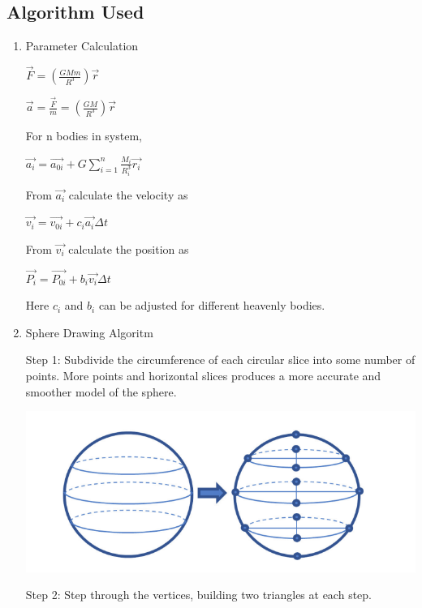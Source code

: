 \documentclass[12pt]{article}
\begin{document}
\subsection{Algorithm Used}
\begin{enumerate}
	\item Parameter Calculation
	
	\qquad$\vec{F} = (\frac{GMm}{R^{3}})\vec{r}$
	
	\qquad$\vec{a} = \frac{\vec{F}}{m} = (\frac{GM}{R^{3}})\vec{r}$
	
	For n bodies in system,
	
	\qquad$\vec{a_{i}} = \vec{a_{0i}} + G \sum_{i=1}^{n} \frac{M_{i}}{R_{i}^{3}} \vec{r_{i}} $	
	
	From $\vec{a_{i}}$ calculate the velocity as
	
	\qquad$\vec{v_{i}} = \vec{v_{0i}} + c_{i}\vec{a_{i}} \Delta t$
	
	From ${\vec{v_{i}}}$ calculate the position as
	
	\qquad$\vec{P_{i}} = \vec{P_{0i}} + b_{i} \vec{v_{i}} \Delta t$
	
	Here $c_{i}$ and $b_{i}$ can be adjusted for different heavenly bodies.
	
	\item Sphere Drawing Algoritm
	
	Step 1: Subdivide the circumference of each circular slice into some number of points. More points and horizontal slices produces a more accurate and smoother model of the sphere.
	
	\begin{center}
	\includegraphics[scale = 0.5]{sphere/1.png}
	\end{center}
\clearpage
	Step 2: Step through the vertices, building two triangles at each step.
	

\end{enumerate}
\end{document}
